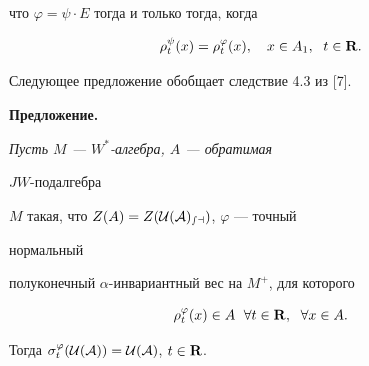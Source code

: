 что $\varphi=\psi\cdot E$ тогда и только тогда, когда 


$$ 


\rho^\psi_t(x)=\rho^\varphi_t(x),\quad 


x\in A_1,\ \; t\in\bold R. 


$$ 


 


Следующее предложение обобщает следствие 4.3 из [7]. 


\medskip 


 


{\bf Предложение.} {\it Пусть $M$ --- $W^*$-алгебра, $A$ --- обратимая 


$JW$-подалгебра 


$M$ такая, что $Z(A)=Z(\cal U(A)_{sa})$, $\varphi$ --- точный 


нормальный 


полуконечный $\alpha$-инвариантный вес на $M^+$, для которого 


$$ 


\rho^\varphi_t(x)\in A\ \; \forall t\in\bold R, 


\ \; \forall x\in A. 


$$ 


Тогда $\sigma^\varphi_t(\cal U(A))=\cal U(A)$, $t\in\bold R$. 


} 


 


